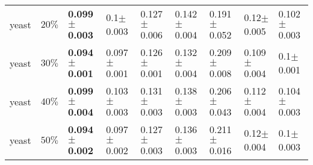\begin{tabular}{lllllllll}
      yeast &     $ 20\% $ & \textbf{0.099$\pm$0.003} &         0.1$\pm$0.003 & 0.127$\pm$0.006 & 0.142$\pm$0.004 & 0.191$\pm$0.052 &  0.12$\pm$0.005 &        0.102$\pm$0.003 \\
      yeast &     $ 30\% $ & \textbf{0.094$\pm$0.001} &       0.097$\pm$0.001 & 0.126$\pm$0.001 & 0.132$\pm$0.004 & 0.209$\pm$0.008 & 0.109$\pm$0.004 &          0.1$\pm$0.001 \\
      yeast &     $ 40\% $ & \textbf{0.099$\pm$0.004} &       0.103$\pm$0.003 & 0.131$\pm$0.003 & 0.138$\pm$0.003 & 0.206$\pm$0.043 & 0.112$\pm$0.004 &        0.104$\pm$0.003 \\
      yeast &     $ 50\% $ & \textbf{0.094$\pm$0.002} &       0.097$\pm$0.002 & 0.127$\pm$0.003 & 0.136$\pm$0.003 & 0.211$\pm$0.016 &  0.12$\pm$0.004 &          0.1$\pm$0.003 \\
\bottomrule
\end{tabular}


